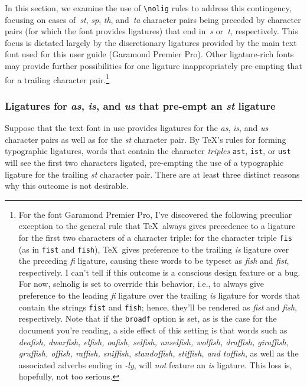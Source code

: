 \documentclass[11pt]{article}
\newcommand{\pkg}[1]{\textsf{#1}}
\newcommand{\opt}[1]{\texttt{#1}}
\newcommand{\cmmd}[1]{\texttt{\textbackslash #1}}
\begin{document}
In this section, we examine the use of \cmmd{nolig} rules to address this contingency, focusing on cases of~\emph{st}, \emph{sp}, \emph{th}, and~\emph{ta} character pairs being preceded by character pairs (for which the font provides ligatures) that end in~\emph{s} or~\emph{t}, respectively. This focus is dictated largely by the discretionary ligatures provided by the main text font used for this user guide (Garamond Premier Pro). Other ligature-rich fonts may provide further possibilities for one ligature inappropriately pre-empting that for a trailing character pair.\footnote{For the font Garamond Premier Pro, I've discovered the following preculiar exception to the general rule that \TeX\ always gives precedence to a ligature for the first two characters of a character triple: for the character triple \opt{fis} (as in \opt{fist} and \opt{fish}), \TeX\ gives preference to the trailing \emph{is} ligature over the preceding \emph{fi} ligature, causing these words to be typeset as \emph{f\mbox{is}h} and \emph{f\mbox{is}t}, respectively. I can't tell if this outcome is a conscious design feature or a bug. For now, \pkg{selnolig} is set to override this behavior, i.e., to always give preference to the leading \emph{fi} ligature over the trailing \emph{is} ligature for words that contain the strings \opt{fist} and \opt{fish}; hence, they'll be rendered as \emph{fist} and \emph{fish}, respectively. Note that if the \opt{broadf} option is set, as is the case for the document you're reading, a side effect of this setting is that words such as \emph{deafish, dwarfish, elfish, oafish, selfish, unselfish, wolfish, draffish, giraffish, gruffish, offish, raffish, sniffish, standoffish, stiffish, \emph{and} toffish}, as well as the associated adverbs ending in \emph{-ly}, will \emph{not} feature an \emph{is} ligature. This loss is, hopefully, not too serious.}



\subsubsection*{Ligatures for \emph{as}, \emph{is}, and \emph{us} that pre-empt an \emph{st} ligature}

Suppose that the text font in use provides ligatures for the \emph{as}, \emph{is}, and \emph{us} character pairs as well as for the \emph{st} character pair. By \TeX's rules for forming typographic ligatures, words that contain the character \emph{triples} \opt{ast}, \opt{ist}, or \opt{ust} will see the first two characters ligated, pre-empting the use of a typographic ligature for the trailing \emph{st} character pair. There are at least three distinct reasons why this outcome is not desirable.
\end{document}
